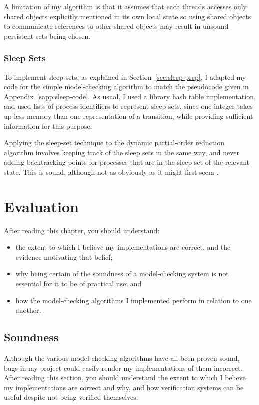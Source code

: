 \documentclass[12pt,a4paper,twoside,openany]{report}
\newenvironment{understandinglist}
	{\begin{itemize} \itemsep 0em}{\end{itemize}}
\begin{document}
A limitation of my algorithm is that
it assumes that each threads accesses
only shared objects
explicitly mentioned in its own
local state so using shared objects
to communicate references to other shared
objects may result in unsound persistent
sets being chosen.

\subsection{Sleep Sets}

To implement sleep sets, as
explained in Section~\ref{sec:sleep-prep},
I adapted my
code for the simple model-checking
algorithm to match the pseudocode
given in Appendix~\ref{sapp:sleep-code}.
As usual, I used a
library hash table implementation,
and used lists of process identifiers
to represent sleep sets, since one
integer takes up less memory
than one representation of a transition,
while providing sufficient information
for this purpose.

Applying the sleep-set technique to the
dynamic partial-order reduction
algorithm involves keeping track of the
sleep sets in the same way, and never
adding backtracking points for
processes that are in the sleep set
of the relevant state. This is
sound, although not as obviously as
it might first seem \cite[Theorem~1]{flan05addm}.

\chapter{Evaluation}
\label{cha:evaluation}

After reading this chapter,
you should understand:
\begin{understandinglist}
	\item the extent to which I believe
	my implementations are correct, and the evidence
	motivating that belief;
	\item why being certain of the
	soundness of a model-checking
	system is not essential for it
	to be of practical use; and
	\item how the model-checking
	algorithms I implemented perform
	in relation to one another.
\end{understandinglist}

\section{Soundness}

Although the various model-checking algorithms
have all been proven sound, bugs in my
project could easily render my implementations
of them incorrect.
After reading this section, you should understand
the extent to which I believe
my implementations are correct and why, and how
verification systems can be useful despite
not being verified themselves.
\end{document}
